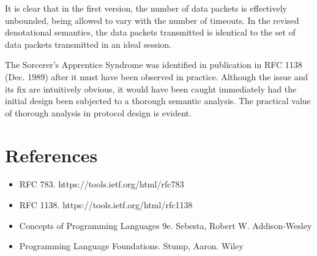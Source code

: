\documentclass[a0,landscape]{a0poster}
\begin{document}
\begin{multicols}{4}
It is clear that in the first version, the number of data packets is effectively unbounded, being allowed to vary with the number of timeouts. In the revised denotational semantics, the data packets transmitted is identical to the set of data packets transmitted in an ideal session.

The Sorcerer's Apprentice Syndrome was identified in publication in RFC 1138 (Dec. 1989) after it must have been observed in practice. Although the issue and its fix are intuitively obvious, it would have been caught immediately had the initial design been subjected to a thorough semantic analysis. The practical value of thorough analysis in protocol design is evident.


\section*{References}

\begin{itemize}
\item{RFC 783.} https://tools.ietf.org/html/rfc783
\item{RFC 1138.} https://tools.ietf.org/html/rfc1138
\item{Concepts of Programming Languages 9e.} Sebesta, Robert W. Addison-Wesley 
\item{Programming Language Foundations.} Stump, Aaron. Wiley 
\end{itemize}


\end{multicols}
\end{document}
